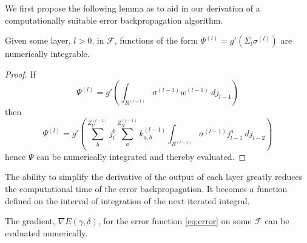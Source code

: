 We first propose the following lemma as to aid in our derivation of a computationally suitable error backpropagation algorithm.


\begin{lemma}
Given some layer, $l>0$, in $\mathcal{F}$, functions of the form $\Psi^{(l)} =g'\left(\Sigma_l\sigma^{(l)}\right)$ are numerically integrable. 
\end{lemma}

\begin{proof}
If\begin{equation}\Psi^{(l)}=g'\left(\int_{R^{(l-1)}}{\sigma^{(l-1)} w^{(l-1)}\ dj_{l-1}}\right)\end{equation}
then
\begin{equation}
\Psi^{(l)}=
 g'\left(
   \sum_b^{Z^{(l-1)}_Y} j_{l}^{b}
   \sum_{a}^{Z^{(l-1)}_X} k_{a,b}^{(l-1)}
    \int_{R^{(l-1)}}{\sigma^{(l-1)} j_{l-1}^a \ dj_{l-2}}
  \right)
\end{equation}
hence $\Psi$ can be numerically integrated and thereby evaluated.
\end{proof}

The ability to simplify the derivative of the output of each layer greatly reduces the computational time of the error backpropagation. It becomes a function defined on the interval of integration of the next iterated integral.

\begin{theorem}
The gradient, $\nabla E(\gamma,\delta)$, for the error function \eqref{eq:error} on some $\mathcal{F}$ can be evaluated numerically.
\end{theorem}

